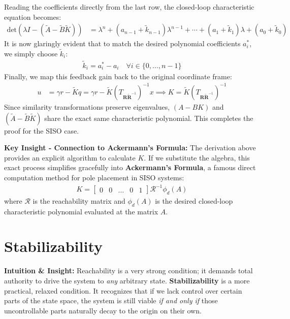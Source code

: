 \documentclass[twoside, 11pt, a4paper]{article}
\begin{document}
%
Reading the coefficients directly from the last row, the closed-loop characteristic equation becomes:
\begin{align*}
\mathrm{det}\left( \lambda I - (\tilde{A} - \tilde{B} \tilde{K}) \right) &=
\lambda^n + ( a_{n-1} + \tilde{k}_{n-1} ) \lambda^{n-1}
	+ \cdots + ( a_{1} + \tilde{k}_1 )  \lambda + ( a_0 + \tilde{k}_0 )
\end{align*}
%
It is now glaringly evident that to match the desired polynomial coefficients $a_i^*$, we simply choose $\tilde{k}_i$:
%
\begin{align*}
	\tilde{k}_i = a_i^* - a_i \quad \forall i \in \{0, \dots, n-1\}
\end{align*} 
%
Finally, we map this feedback gain back to the original coordinate frame:
\begin{align*}
 u &= \gamma r - \tilde{K} q = \gamma r - \tilde{K} \left( T_{\mathbf{R} \tilde{\mathbf{R}}^{-1}} \right)^{-1} x  \implies K = \tilde{K} \left( T_{\mathbf{R} \tilde{\mathbf{R}}^{-1}} \right)^{-1}
\end{align*} 
%
Since similarity transformations preserve eigenvalues, $(A - B K)$ and $( \tilde{A} - \tilde{B} \tilde{K} )$ share the exact same characteristic polynomial. This completes the proof for the SISO case.

\vspace{0.2in}
\textbf{Key Insight - Connection to Ackermann's Formula:} 
The derivation above provides an explicit algorithm to calculate $K$. If we substitute the algebra, this exact process simplifies gracefully into \textbf{Ackermann's Formula}, a famous direct computation method for pole placement in SISO systems:
\begin{align*}
    K = \begin{bmatrix} 0 & 0 & \dots & 0 & 1 \end{bmatrix} \mathcal{R}^{-1} \phi_d(A)
\end{align*}
where $\mathcal{R}$ is the reachability matrix and $\phi_d(A)$ is the desired closed-loop characteristic polynomial evaluated at the matrix $A$.

 \section{Stabilizability}

 \textbf{Intuition \& Insight:} Reachability is a very strong condition; it demands total authority to drive the system to \textit{any} arbitrary state. \textbf{Stabilizability} is a more practical, relaxed condition. It recognizes that if we lack control over certain parts of the state space, the system is still viable \textit{if and only if} those uncontrollable parts naturally decay to the origin on their own.
\end{document}
